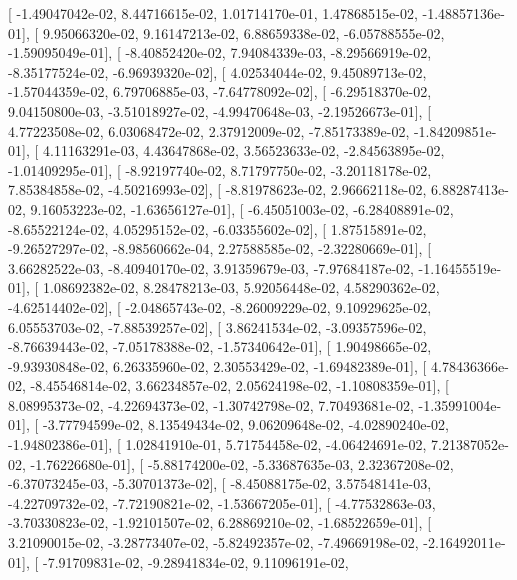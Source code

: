 \documentclass{article}
\begin{document}
       [ -1.49047042e-02,   8.44716615e-02,   1.01714170e-01,
          1.47868515e-02,  -1.48857136e-01],
       [  9.95066320e-02,   9.16147213e-02,   6.88659338e-02,
         -6.05788555e-02,  -1.59095049e-01],
       [ -8.40852420e-02,   7.94084339e-03,  -8.29566919e-02,
         -8.35177524e-02,  -6.96939320e-02],
       [  4.02534044e-02,   9.45089713e-02,  -1.57044359e-02,
          6.79706885e-03,  -7.64778092e-02],
       [ -6.29518370e-02,   9.04150800e-03,  -3.51018927e-02,
         -4.99470648e-03,  -2.19526673e-01],
       [  4.77223508e-02,   6.03068472e-02,   2.37912009e-02,
         -7.85173389e-02,  -1.84209851e-01],
       [  4.11163291e-03,   4.43647868e-02,   3.56523633e-02,
         -2.84563895e-02,  -1.01409295e-01],
       [ -8.92197740e-02,   8.71797750e-02,  -3.20118178e-02,
          7.85384858e-02,  -4.50216993e-02],
       [ -8.81978623e-02,   2.96662118e-02,   6.88287413e-02,
          9.16053223e-02,  -1.63656127e-01],
       [ -6.45051003e-02,  -6.28408891e-02,  -8.65522124e-02,
          4.05295152e-02,  -6.03355602e-02],
       [  1.87515891e-02,  -9.26527297e-02,  -8.98560662e-04,
          2.27588585e-02,  -2.32280669e-01],
       [  3.66282522e-03,  -8.40940170e-02,   3.91359679e-03,
         -7.97684187e-02,  -1.16455519e-01],
       [  1.08692382e-02,   8.28478213e-03,   5.92056448e-02,
          4.58290362e-02,  -4.62514402e-02],
       [ -2.04865743e-02,  -8.26009229e-02,   9.10929625e-02,
          6.05553703e-02,  -7.88539257e-02],
       [  3.86241534e-02,  -3.09357596e-02,  -8.76639443e-02,
         -7.05178388e-02,  -1.57340642e-01],
       [  1.90498665e-02,  -9.93930848e-02,   6.26335960e-02,
          2.30553429e-02,  -1.69482389e-01],
       [  4.78436366e-02,  -8.45546814e-02,   3.66234857e-02,
          2.05624198e-02,  -1.10808359e-01],
       [  8.08995373e-02,  -4.22694373e-02,  -1.30742798e-02,
          7.70493681e-02,  -1.35991004e-01],
       [ -3.77794599e-02,   8.13549434e-02,   9.06209648e-02,
         -4.02890240e-02,  -1.94802386e-01],
       [  1.02841910e-01,   5.71754458e-02,  -4.06424691e-02,
          7.21387052e-02,  -1.76226680e-01],
       [ -5.88174200e-02,  -5.33687635e-03,   2.32367208e-02,
         -6.37073245e-03,  -5.30701373e-02],
       [ -8.45088175e-02,   3.57548141e-03,  -4.22709732e-02,
         -7.72190821e-02,  -1.53667205e-01],
       [ -4.77532863e-03,  -3.70330823e-02,  -1.92101507e-02,
          6.28869210e-02,  -1.68522659e-01],
       [  3.21090015e-02,  -3.28773407e-02,  -5.82492357e-02,
         -7.49669198e-02,  -2.16492011e-01],
       [ -7.91709831e-02,  -9.28941834e-02,   9.11096191e-02,
\end{document}
